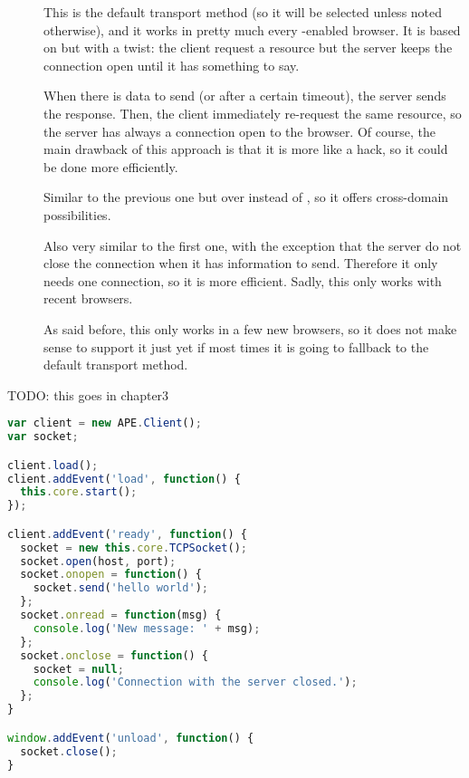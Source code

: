 \begin{description}
  \item[] This is the default transport method (so it will be selected unless noted otherwise), and it works in pretty much every -enabled browser.
  It is based on  but with a twist: the client request a resource but the server keeps the  connection open until it has something to say.
  
  When there is data to send (or after a certain timeout), the server sends the response.
  Then, the client immediately re-request the same resource, so the server has always a connection open to the browser.
  Of course, the main drawback of this approach is that it is more like a hack, so it could be done more efficiently.
  \item[] Similar to the previous one but over  instead of , so it offers cross-domain possibilities.
  \item[] Also very similar to the first one, with the exception that the server do not close the connection when it has information to send.
  Therefore it only needs one connection, so it is more efficient.
  Sadly, this only works with recent browsers.
  \item[] As said before, this only works in a few new browsers, so it does not make sense to support it just yet if most times it is going to fallback to the default transport method.
\end{description}


TODO: this goes in chapter3

\begin{lstlisting}[language=JavaScript,label=apesocket,caption=TCPSocket usage in APE JSF]
var client = new APE.Client();
var socket;

client.load();
client.addEvent('load', function() {
  this.core.start();
});

client.addEvent('ready', function() {
  socket = new this.core.TCPSocket();
  socket.open(host, port);
  socket.onopen = function() {
    socket.send('hello world');
  };
  socket.onread = function(msg) {
    console.log('New message: ' + msg);
  };
  socket.onclose = function() {
    socket = null;
    console.log('Connection with the server closed.');
  };
}

window.addEvent('unload', function() {
  socket.close();
}
\end{lstlisting}


